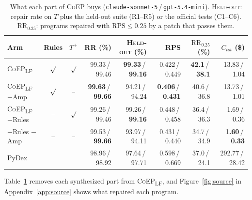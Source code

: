 \documentclass[acmsmall,screen,review,anonymous,nonacm]{acmart}
\newcommand{\tool}{\textsc{CoEP}\xspace}
\newcommand{\coepLF}{\textsc{CoEP}\textsubscript{LF}\xspace}
\providecommand{\checkmark}{$\surd$}
\newcommand{\V}[1]{\ensuremath{\mathit{#1}}}
\newcommand{\RPS}{\mathrm{RPS}}
\newcommand{\cs}{\texttt{claude-sonnet-5}\xspace}
\newcommand{\gm}{\texttt{gpt-5.4-mini}\xspace}
\begin{document}
\begin{table}[t]
\caption{What each part of \tool buys (\cs\,/\,\gm). \textsc{Held-out}: repair rate on $T$ plus the held-out suite (R1--R5) or the official tests (C1--C6). $\mathrm{RR}_{0.25}$: programs repaired with $\RPS \le 0.25$ by a patch that passes them.}
\label{tab:ablation}
\centering
\footnotesize
\setlength{\tabcolsep}{3.5pt}
\begin{tabular}{l|cc||rrrr||r}
\toprule
\textbf{Arm} & \textbf{Rules} & $T^{+}$ & RR (\%) & \textsc{Held-out} (\%) & RPS & $\mathrm{RR}_{0.25}$ (\%) & $C_{\V{tot}}$ (\$) \\
\midrule\midrule
\coepLF & \checkmark & \checkmark & 99.33\,/\,99.46 & \textbf{99.33}\,/\,\textbf{99.16} & 0.422\,/\,0.449 & \textbf{42.1}\,/\,\textbf{38.1} & 13.83\,/\,1.04 \\
\coepLF$-$Amp & \checkmark & -- & \textbf{99.63}\,/\,\textbf{99.66} & 94.21\,/\,94.24 & \textbf{0.406}\,/\,\textbf{0.431} & 40.6\,/\,36.8 & 13.73\,/\,1.01 \\
\coepLF$-$Rules & -- & \checkmark & 99.26\,/\,99.46 & 99.26\,/\,\textbf{99.16} & 0.448\,/\,0.458 & 36.4\,/\,36.3 & 1.69\,/\,0.36 \\
$-$Rules $-$Amp & -- & -- & 99.53\,/\,\textbf{99.66} & 93.97\,/\,94.11 & 0.431\,/\,0.440 & 34.7\,/\,34.9 & \textbf{1.60}\,/\,\textbf{0.33} \\
\midrule
PyDex & & & 98.96\,/\,98.92 & 97.64\,/\,97.71 & 0.598\,/\,0.669 & 37.0\,/\,24.1 & 292.77\,/\,28.42 \\
\bottomrule
\end{tabular}
\end{table}

Table~\ref{tab:ablation} removes each synthesized part from \coepLF, and Figure~\ref{fig:source} in Appendix~\ref{app:source} shows what repaired each program.
\end{document}
